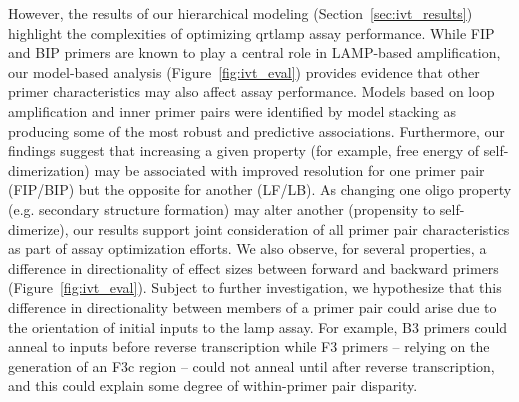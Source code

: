 \documentclass[../thesis.tex]{subfiles}
\begin{document}
However, the results of our hierarchical modeling (Section~\ref{sec:ivt_results}) highlight the complexities of optimizing \gls{qrtlamp} assay performance. While FIP and BIP primers are known to play a central role in LAMP-based amplification, our model-based analysis (Figure~\ref{fig:ivt_eval}) provides evidence that other primer characteristics may also affect assay performance. Models based on loop amplification and inner primer pairs were identified by model stacking as producing some of the most robust and predictive associations. Furthermore, our findings suggest that increasing a given property (for example, free energy of self-dimerization) may be associated with improved resolution for one primer pair (FIP/BIP) but the opposite for another (LF/LB). As changing one oligo property (e.g. secondary structure formation) may alter another (propensity to self-dimerize), our results support joint consideration of all primer pair characteristics as part of assay optimization efforts. %
We also observe, for several properties, a difference in directionality of effect sizes between forward and backward primers (Figure~\ref{fig:ivt_eval}). Subject to further investigation, we hypothesize that this difference in directionality between members of a primer pair could arise due to the orientation of initial  inputs to the \gls{lamp} assay. For example, B3 primers could anneal to  inputs before reverse transcription while F3 primers -- relying on the generation of an F3c region -- could not anneal until after reverse transcription, and this could explain some degree of within-primer pair disparity.
\end{document}
